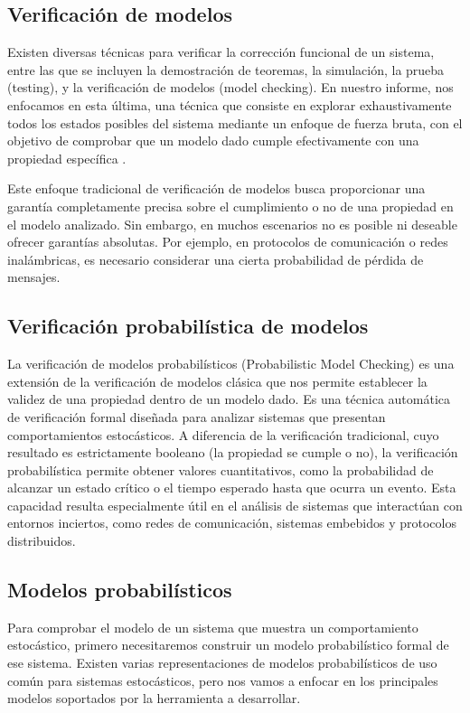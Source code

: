 \documentclass[runningheads]{llncs}
\begin{document}
\subsection{Verificación de modelos}

Existen diversas técnicas para verificar la corrección funcional de un sistema, entre las que se incluyen la demostración de teoremas, la simulación, la prueba (testing), y la verificación de modelos (model checking). En nuestro informe, nos enfocamos en esta última, una técnica que consiste en explorar exhaustivamente todos los estados posibles del sistema mediante un enfoque de fuerza bruta, con el objetivo de comprobar que un modelo dado cumple efectivamente con una propiedad específica \cite{BK07}.

Este enfoque tradicional de verificación de modelos busca proporcionar una garantía completamente precisa sobre el cumplimiento o no de una propiedad en el modelo analizado. Sin embargo, en muchos escenarios no es posible ni deseable ofrecer garantías absolutas. Por ejemplo, en protocolos de comunicación o redes inalámbricas, es necesario considerar una cierta probabilidad de pérdida de mensajes.

\subsection{Verificación probabilística de modelos}

La verificación de modelos probabilísticos (Probabilistic Model Checking) es una extensión de la verificación de modelos clásica que nos permite establecer la validez de una propiedad dentro de un modelo dado. Es una técnica automática de verificación formal diseñada para analizar sistemas que presentan comportamientos estocásticos.
A diferencia de la verificación tradicional, cuyo resultado es estrictamente booleano (la propiedad se cumple o no), la verificación probabilística permite obtener valores cuantitativos, como la probabilidad de alcanzar un estado crítico o el tiempo esperado hasta que ocurra un evento. Esta capacidad resulta especialmente útil en el análisis de sistemas que interactúan con entornos inciertos, como redes de comunicación, sistemas embebidos y protocolos distribuidos.

\subsection{Modelos probabilísticos}
Para comprobar el modelo de un sistema que muestra un comportamiento estocástico, primero necesitaremos construir un modelo probabilístico formal de ese sistema. Existen varias representaciones de modelos probabilísticos de uso común para sistemas estocásticos, pero nos vamos a enfocar en los principales modelos soportados por la herramienta a desarrollar.
\end{document}
